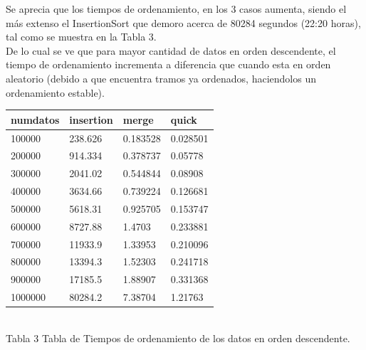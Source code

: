 \documentclass{article}
\begin{document}
Se aprecia que los tiempos de ordenamiento, en los 3 casos aumenta, siendo el más extenso el InsertionSort que demoro acerca de 80284 segundos (22:20 horas), tal como se muestra en la Tabla 3.\\

De lo cual se ve que para mayor cantidad de datos en orden descendente, el tiempo de ordenamiento incrementa a diferencia que cuando esta en orden aleatorio (debido a que encuentra tramos ya ordenados, haciendolos un ordenamiento estable).

\begin{center}
\begin{tabular}{|l|l|l|l|}
\hline
numdatos & insertion & merge & quick\\
\hline
100000 & 238.626 & 0.183528 & 0.028501\\
200000 & 914.334 & 0.378737 & 0.05778\\
300000 & 2041.02 & 0.544844 & 0.08908\\
400000 & 3634.66 & 0.739224 & 0.126681\\
500000 & 5618.31 & 0.925705 & 0.153747\\
600000 & 8727.88 & 1.4703 & 0.233881\\
700000 & 11933.9 & 1.33953 & 0.210096\\
800000 & 13394.3 & 1.52303 & 0.241718\\
900000 & 17185.5 & 1.88907 & 0.331368\\
1000000 & 80284.2 & 7.38704 & 1.21763\\
\hline
\end{tabular}\\

Tabla 3 Tabla de Tiempos de ordenamiento de los datos en orden descendente.
\end{center}
\end{document}
